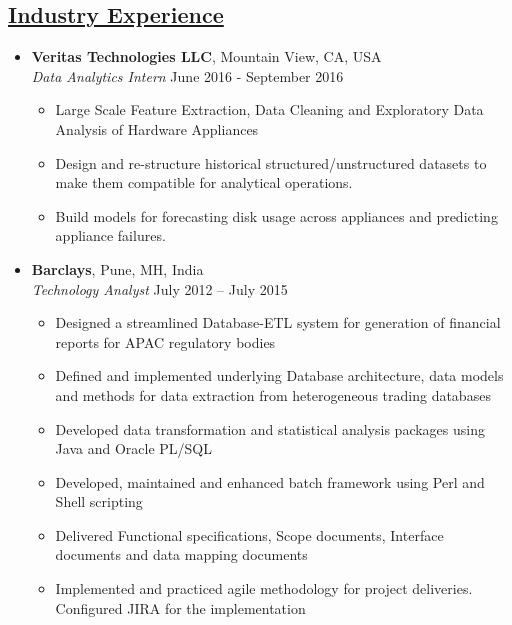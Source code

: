 \documentclass[10pt]{article}
\begin{document}
\subsection*{\underline{Industry Experience}}
\begin{itemize}[leftmargin=0.15in]
\item {\bfseries Veritas Technologies LLC}, Mountain View, CA, USA \\
{\sl Data Analytics Intern}  \hfill June 2016 - September 2016
\vspace{-0.25cm}
\begin{itemize}
\setlength{\itemsep}{0pt}%
\item Large Scale Feature Extraction, Data Cleaning and Exploratory Data Analysis of Hardware Appliances
\item Design and re-structure historical structured/unstructured datasets to make them compatible for analytical operations.
\item Build models for forecasting disk usage across appliances and predicting appliance failures.
\end{itemize}

\item  {\bfseries Barclays}, Pune, MH, India \\
{\sl Technology Analyst} \hfill July 2012 – July 2015
\vspace{-0.25cm}
\begin{itemize}
\setlength{\itemsep}{0pt}%
\item Designed a streamlined Database-ETL system for generation of financial reports for APAC regulatory bodies
\item Defined and implemented underlying Database architecture, data models and methods for data extraction from heterogeneous trading databases
\item Developed data transformation and statistical analysis packages using Java and Oracle PL/SQL
\item Developed, maintained and enhanced batch framework using Perl and Shell scripting
\item Delivered Functional specifications, Scope documents, Interface documents and data mapping documents
\item Implemented and practiced agile methodology for project deliveries. Configured JIRA for the implementation
\end{itemize}
\end{itemize}
\end{document}
